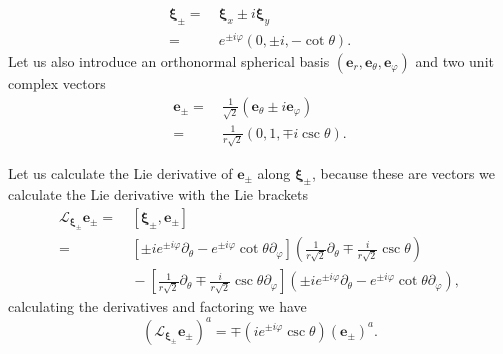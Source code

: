 \begin{align*}
\boldsymbol{\xi}_{\pm}= & \ \boldsymbol{\xi}_{x}\pm i\boldsymbol{\xi}_{y}\\
= & \ e^{\pm i\varphi}\left(0,\pm i,-\cot\theta\right).
\end{align*}
Let us also introduce an orthonormal spherical basis $(\boldsymbol{e}_{r},\boldsymbol{e}_{\theta},\boldsymbol{e}_{\varphi})$
and two unit complex vectors
\begin{align*}
\boldsymbol{e}_{\pm}= & \ \frac{1}{\sqrt{2}}\left(\boldsymbol{e}_{\theta}\pm i\boldsymbol{e}_{\varphi}\right)\\
= & \ \frac{1}{r\sqrt{2}}\left(0,1,\mp i\csc\theta\right).
\end{align*}

Let us calculate the Lie derivative of $\boldsymbol{e}_{\pm}$ along
$\boldsymbol{\xi}_{\pm}$, because these are vectors we calculate
the Lie derivative with the Lie brackets
\begin{align*}
\mathcal{L}_{\boldsymbol{\xi}_{\pm}}\boldsymbol{e}_{\pm}= & \ \left[\boldsymbol{\xi}_{\pm},\boldsymbol{e}_{\pm}\right]\\
= & \ \left[\pm ie^{\pm i\varphi}\partial_{\theta}-e^{\pm i\varphi}\cot\theta\partial_{\varphi}\right]\left(\frac{1}{r\sqrt{2}}\partial_{\theta}\mp\frac{i}{r\sqrt{2}}\csc\theta\right)\\
\  & \ -\left[\frac{1}{r\sqrt{2}}\partial_{\theta}\mp\frac{i}{r\sqrt{2}}\csc\theta\partial_{\varphi}\right]\left(\pm ie^{\pm i\varphi}\partial_{\theta}-e^{\pm i\varphi}\cot\theta\partial_{\varphi}\right),
\end{align*}
calculating the derivatives and factoring we have
\[
\left(\mathcal{L}_{\boldsymbol{\xi}_{\pm}}\boldsymbol{e}_{\pm}\right)^{a}=\mp\left(ie^{\pm i\varphi}\csc\theta\right)\left(\boldsymbol{e}_{\pm}\right)^{a}.
\]

